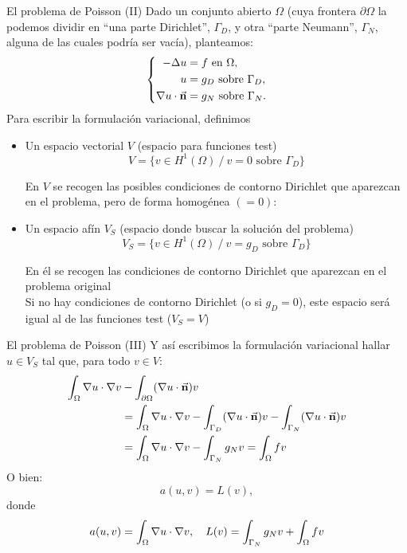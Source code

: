 \documentclass[9pt, dvipsnames,]{beamer}
\begin{document}
\begin{frame}{El problema de Poisson (II)}
  Dado un conjunto abierto $\Omega$ (cuya frontera $\partial\Omega$ la
  podemos dividir en ``una parte Dirichlet'', $\Gamma_D$, y otra
  ``parte Neumann'', $\Gamma_N$, alguna de las cuales podría ser
  vacía), planteamos:
  \begin{equation*}
    \left\{
    \begin{aligned}
      -\Delta u &= f \text{ en } \Omega, \\
      u&=g_D \text{ sobre } \Gamma_D, \\
      \nabla u \cdot \vec{\mathbf{n}} &=g_N \text{ sobre } \Gamma_N.
    \end{aligned}
    \right.
  \end{equation*}
  Para escribir la formulación variacional, definimos
  \begin{itemize}
  \item Un espacio vectorial $V$ (espacio para funciones test)
    $$ V = \{ v\in H^1(\Omega) \ / \ v=0 \text{ sobre } {\Gamma_D} \}$$
    \begin{flushright}\small
    En $V$ se recogen las posibles condiciones de contorno
      Dirichlet que aparezcan en el problema, pero de forma homogénea
      $(=0)$:
    \end{flushright}
\item Un espacio afín $V_{S}$ (espacio donde buscar la solución del problema)
    $$ V_S = \{ v\in H^1(\Omega) \ / \ v=g_D \text{ sobre } {\Gamma_D} \}$$
    \begin{flushright}\small
      En él se recogen las condiciones de contorno Dirichlet que
      aparezcan en el problema original
      \\
      Si no hay condiciones de contorno Dirichlet (o si $g_D=0$), este
      espacio será igual al de las funciones test ($V_S=V$)
    \end{flushright}
  \end{itemize}
\end{frame}

\begin{frame}{El problema de Poisson (III)}
  Y así escribimos la formulación variacional hallar $u\in V_S$ tal
  que, para todo $v\in V$:
  \begin{align*}
      \int_\Omega \nabla u \cdot \nabla v
      &- \int_{\partial\Omega} (\nabla u \cdot \vec{\mathbf{n}}) v
      \\
      &=\int_\Omega \nabla u \cdot \nabla v
      - \int_{\Gamma_D} (\nabla u \cdot \vec{\mathbf{n}}) v
      - \int_{\Gamma_N} (\nabla u \cdot \vec{\mathbf{n}}) v
      \\
      &=\int_\Omega \nabla u \cdot \nabla v
      - \int_{\Gamma_N} g_N v
      = \int_\Omega  f v
    \end{align*}
    O bien:
    $$
    a(u,v) = L(v),
    $$
    donde
    \begin{equation*}
      a(u,v)=\int_\Omega \nabla u \cdot \nabla v,
      \quad
      L(v)=  \int_{\Gamma_N} g_N v + \int_\Omega  f v
    \end{equation*}
\end{frame}
\end{document}
